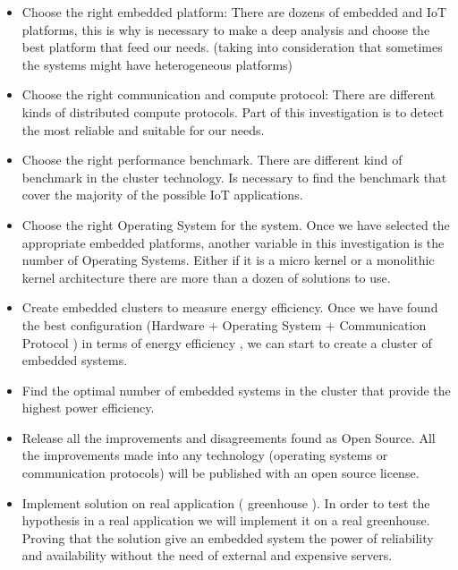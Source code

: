 \begin{itemize}

\item Choose the right embedded platform: There are dozens of embedded and IoT
platforms, this is why is necessary to make a deep analysis and choose the best
platform that feed our needs. (taking into consideration that sometimes the
systems might have heterogeneous platforms)

\item Choose the right communication and compute protocol: There are different
kinds of distributed compute protocols. Part of this investigation is to detect
the most reliable and suitable for our needs.

\item Choose the right performance benchmark. There are different kind of
benchmark in the cluster technology. Is necessary to find the benchmark that
cover the majority of the possible IoT applications.

\item Choose the right Operating System for the system. Once we have selected
the appropriate embedded platforms, another variable in this investigation is
the number of Operating Systems. Either if it is a micro kernel or a monolithic
kernel architecture there are more than a dozen of solutions to use.

\item Create embedded clusters to measure energy efficiency. Once we have found
the best configuration (Hardware + Operating System + Communication Protocol )
in terms of energy efficiency , we can start to create a cluster of embedded
systems.

\item Find the optimal number of embedded systems in the cluster that provide
the highest power efficiency. 

\item Release all the improvements and disagreements found as Open Source. All
the improvements made into any technology (operating systems or communication
protocols) will be published with an open source license.

\item Implement solution on real application ( greenhouse ). In order to test
the hypothesis in a real application we will implement it on a real greenhouse.
Proving that the solution give an embedded system the power of reliability and
availability without the need of external and expensive servers.
\end{itemize}

\clearpage
